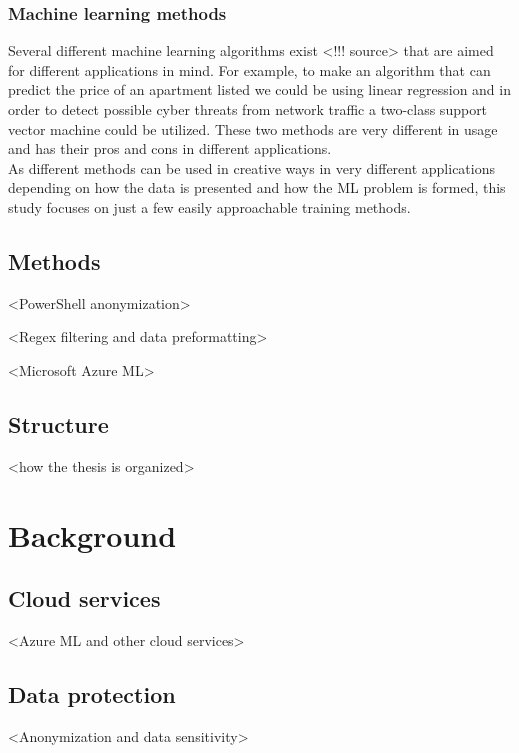 \documentclass[english, 12pt, a4paper, elec, utf8, a-1b, online]{aaltothesis}
\begin{document}
\subsubsection*{Machine learning methods}
Several different machine learning algorithms exist
<!!! source>
that are aimed for different applications in mind.
For example,
to make an algorithm that can predict
the price of an apartment listed
we could be using linear regression
and in order to detect
possible cyber threats from network traffic
a two-class support vector machine could be utilized.
These two methods are very different in usage
and has their pros and cons in different applications.
\\
As different methods can be used in creative ways
in very different applications
depending on how the data is presented
and how the ML problem is formed,
this study focuses on
just a few easily approachable training methods.


\subsection{Methods}
<PowerShell anonymization>

<Regex filtering and data preformatting>

<Microsoft Azure ML>

\subsection{Structure}
<how the thesis is organized>

\clearpage

\section{Background}

\subsection{Cloud services}
<Azure ML and other cloud services>

\subsection{Data protection}
<Anonymization and data sensitivity>
\end{document}
